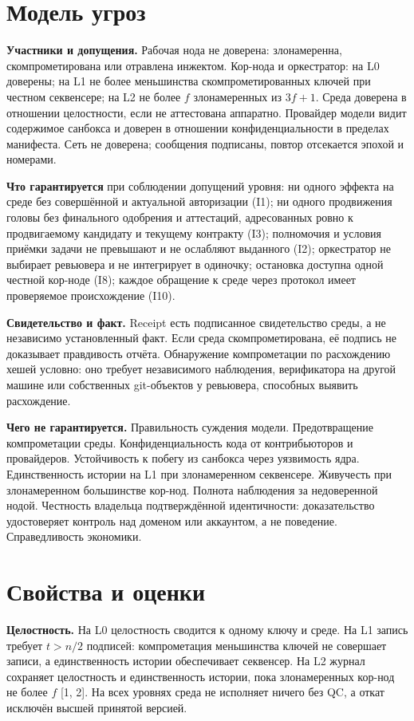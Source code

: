 \documentclass[11pt,a4paper]{article}
\begin{document}
\section{Модель угроз}

\textbf{Участники и допущения.} Рабочая нода не доверена: злонамеренна, скомпрометирована или отравлена инжектом. Кор-нода и оркестратор: на L0 доверены; на L1 не более меньшинства скомпрометированных ключей при честном секвенсере; на L2 не более $f$ злонамеренных из $3f+1$. Среда доверена в отношении целостности, если не аттестована аппаратно. Провайдер модели видит содержимое санбокса и доверен в отношении конфиденциальности в пределах манифеста. Сеть не доверена; сообщения подписаны, повтор отсекается эпохой и номерами.

\textbf{Что гарантируется} при соблюдении допущений уровня: ни одного эффекта на среде без совершённой и актуальной авторизации (I1); ни одного продвижения головы без финального одобрения и аттестаций, адресованных ровно к продвигаемому кандидату и текущему контракту (I3); полномочия и условия приёмки задачи не превышают и не ослабляют выданного (I2); оркестратор не выбирает ревьювера и не интегрирует в одиночку; остановка доступна одной честной кор-ноде (I8); каждое обращение к среде через протокол имеет проверяемое происхождение (I10).

\textbf{Свидетельство и факт.} Receipt есть подписанное свидетельство среды, а не независимо установленный факт. Если среда скомпрометирована, её подпись не доказывает правдивость отчёта. Обнаружение компрометации по расхождению хешей условно: оно требует независимого наблюдения, верификатора на другой машине или собственных git-объектов у ревьювера, способных выявить расхождение.

\textbf{Чего не гарантируется.} Правильность суждения модели. Предотвращение компрометации среды. Конфиденциальность кода от контрибьюторов и провайдеров. Устойчивость к побегу из санбокса через уязвимость ядра. Единственность истории на L1 при злонамеренном секвенсере. Живучесть при злонамеренном большинстве кор-нод. Полнота наблюдения за недоверенной нодой. Честность владельца подтверждённой идентичности: доказательство удостоверяет контроль над доменом или аккаунтом, а не поведение. Справедливость экономики.

\section{Свойства и оценки}

\textbf{Целостность.} На L0 целостность сводится к одному ключу и среде. На L1 запись требует $t > n/2$ подписей: компрометация меньшинства ключей не совершает записи, а единственность истории обеспечивает секвенсер. На L2 журнал сохраняет целостность и единственность истории, пока злонамеренных кор-нод не более $f$ [1, 2]. На всех уровнях среда не исполняет ничего без QC, а откат исключён высшей принятой версией.
\end{document}
